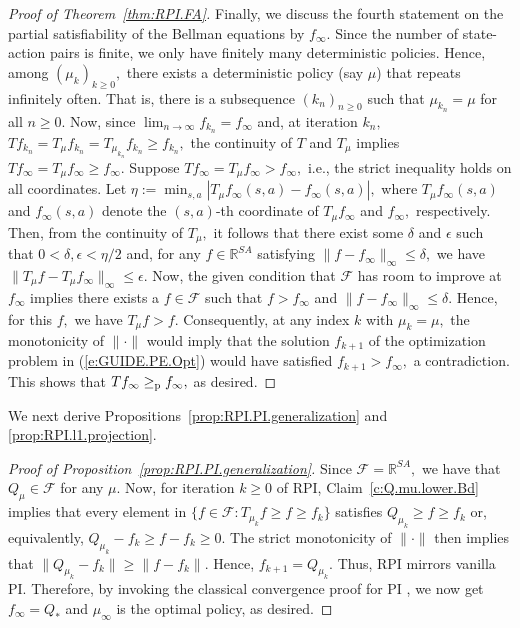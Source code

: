 \documentclass[twoside]{article}
\theoremstyle{plain}
\theoremstyle{definition}
\theoremstyle{remark}
\newcommand{\QS}{Q_*}
\newcommand{\bR}{\mathbb{R}}
\newcommand{\cF}{\mathcal{F}}
\newcommand{\gep}{\geq_{\textnormal{p}}}
\renewcommand{\eqref}[1]{(\ref{#1})}
\begin{document}
\begin{proof}[Proof of Theorem~\ref{thm:RPI.FA}]
Finally, we discuss the fourth statement on the partial satisfiability of the Bellman equations by $f_\infty.$ Since the number of state-action pairs is finite, we only have finitely many deterministic policies. Hence, among $(\mu_k)_{k \geq 0},$ there exists a deterministic policy (say $\mu$) that repeats infinitely often. That is, there is a subsequence $(k_n)_{n \geq 0}$ such that $\mu_{k_n} = \mu$ for all $n \geq 0.$ Now, since $\lim_{n \to \infty} f_{k_n} = f_{\infty}$ and, at iteration $k_n,$ $T f_{k_n} = T_{\mu} f_{k_n} = T_{\mu_{k_n}} f_{k_n} \geq f_{k_n},$ the continuity of $T$ and $T_\mu$ implies $T f_\infty = T_{\mu} f_\infty \geq f_\infty.$ 
%
Suppose $T f_\infty = T_{\mu} f_\infty > f_\infty,$ i.e., the strict inequality holds on all coordinates. Let $\eta := \min_{s, a}|T_\mu f_\infty(s, a) - f_\infty(s, a)|,$ where $T_{\mu} f_\infty(s, a)$ and $f_\infty(s,a)$ denote the $(s, a)$-th coordinate of $T_{\mu} f_\infty$ and $f_\infty,$ respectively. Then, from the continuity of $T_\mu,$ it follows that there exist some $\delta$ and $\epsilon$ such that $0 < \delta, \epsilon <  \eta/2$ and, for any $f \in \bR^{SA}$ satisfying $\|f - f_\infty\|_\infty \leq \delta,$ we have $\|T_\mu f - T_{\mu} f_\infty\|_\infty \leq \epsilon.$ Now, the given condition that $\cF$ has room to improve at $f_\infty$ implies there exists a $f \in \cF$ such that $f > f_\infty$ and $\|f - f_\infty\|_\infty \leq \delta.$ Hence, for this $f,$ we have $T_{\mu} f > f.$ Consequently, at any index $k$ with $\mu_k = \mu,$ the monotonicity of $\|\cdot\|$ would imply that the solution $f_{k + 1}$ of the optimization problem in \eqref{e:GUIDE.PE.Opt} would have satisfied $f_{k + 1} > f_\infty,$ a contradiction. This shows that $T f_\infty \gep f_\infty,$ as desired.
%
\end{proof}

We next derive Propositions~\ref{prop:RPI.PI.generalization} and \ref{prop:RPI.l1.projection}.    

\begin{proof}[Proof of Proposition~\ref{prop:RPI.PI.generalization}]
%
Since $\cF = \bR^{SA},$ we have that $Q_{\mu} \in \cF$ for any $\mu.$ Now, for iteration $k \geq 0$ of RPI, Claim~\ref{c:Q.mu.lower.Bd} implies that every element in $\{f \in \cF: T_{\mu_k}f \geq f \geq f_k\}$ satisfies $Q_{\mu_k} \geq f \geq f_k$ or, equivalently, $Q_{\mu_k} - f_k \geq f - f_k \geq 0.$ The strict monotonicity of $\|\cdot\|$ then implies that  $\|Q_{\mu_k} - f_k\| \geq \|f - f_k\|.$ Hence, $f_{k + 1} = Q_{\mu_k}.$ Thus, RPI mirrors vanilla PI. Therefore, by invoking the classical convergence proof for PI \citep{bertsekas1996neuro}, we now get $f_\infty = \QS$ and $\mu_\infty$ is the optimal policy, as desired. 
%
\end{proof}
\end{document}
